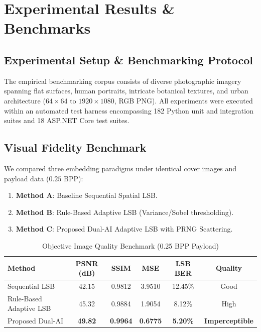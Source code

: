 \documentclass[conference]{IEEEtran}
\begin{document}
\section{Experimental Results \& Benchmarks}

\subsection{Experimental Setup \& Benchmarking Protocol}
The empirical benchmarking corpus consists of diverse photographic imagery spanning flat surfaces, human portraits, intricate botanical textures, and urban architecture ($64 \times 64$ to $1920 \times 1080$, RGB PNG). All experiments were executed within an automated test harness encompassing 182 Python unit and integration suites and 18 ASP.NET Core test suites.

\subsection{Visual Fidelity Benchmark}
We compared three embedding paradigms under identical cover images and payload data ($0.25$ BPP):
\begin{enumerate}
    \item \textbf{Method A}: Baseline Sequential Spatial LSB.
    \item \textbf{Method B}: Rule-Based Adaptive LSB (Variance/Sobel thresholding).
    \item \textbf{Method C}: Proposed Dual-AI Adaptive LSB with PRNG Scattering.
\end{enumerate}

\begin{table}[htbp]
\caption{Objective Image Quality Benchmark (0.25 BPP Payload)}
\label{tab:quality}
\centering
\begin{tabular}{@{}lccccc@{}}
\toprule
\textbf{Method} & \textbf{PSNR (dB)} & \textbf{SSIM} & \textbf{MSE} & \textbf{LSB BER} & \textbf{Quality} \\
\midrule
Sequential LSB          & 42.15 & 0.9812 & 3.9510 & 12.45\% & Good \\
Rule-Based Adaptive LSB & 45.32 & 0.9884 & 1.9054 & 8.12\%  & High \\
Proposed Dual-AI        & \textbf{49.82} & \textbf{0.9964} & \textbf{0.6775} & \textbf{5.20\%} & \textbf{Imperceptible} \\
\bottomrule
\end{tabular}
\end{table}
\end{document}
